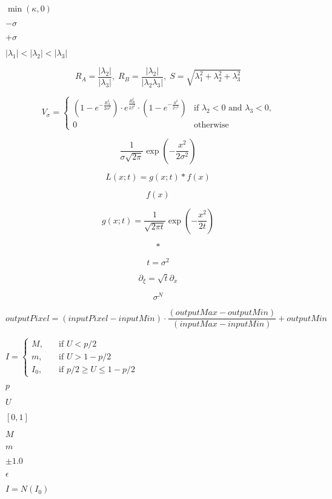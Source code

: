 \documentclass{article}
\begin{document}
$ \min(\kappa,0) $
\pagebreak

$-\sigma$
\pagebreak

$+\sigma$
\pagebreak

$ | \lambda_1 | < | \lambda_2 | < |\lambda_3 | $
\pagebreak

\[ R_A = \frac{|\lambda_2|}{|\lambda_3|}, \; R_B = \frac{|\lambda_2|}{|\lambda_2\lambda_3|}, \; S = \sqrt{\lambda_1^2+\lambda_2^2+\lambda_3^2} \]
\pagebreak

\[ V_{\sigma}= \begin{cases} (1-e^{-\frac{R_A^2}{2\alpha^2}}) \cdot e^{\frac{R_B^2}{2\beta^2}} \cdot (1-e^{-\frac{S^2}{2\gamma^2}}) & \text{if } \lambda_2<0 \text{ and } \lambda_3<0 \text{,}\\ 0 & \text{otherwise} \end{cases} \]
\pagebreak

\[ \frac{ 1 }{ \sigma \sqrt{ 2 \pi } } \exp{ \left( - \frac{x^2}{ 2 \sigma^2 } \right) } \]
\pagebreak

\[ L(x; t) = g(x; t) \ast f(x) \]
\pagebreak

\[ f(x) \]
\pagebreak

\[ g(x; t) = \frac{1}{ \sqrt{ 2 \pi t} } \exp{ \left( -\frac{x^2}{ 2 t } \right) } \]
\pagebreak

\[\ast\]
\pagebreak

\[ t = \sigma^2 \]
\pagebreak

\[ \partial_\xi = \sqrt{t} \partial_x \]
\pagebreak

\[ \sigma^N \]
\pagebreak

\[ outputPixel = ( inputPixel - inputMin) \cdot \frac{(outputMax - outputMin )}{(inputMax - inputMin)} + outputMin \]
\pagebreak

$ I = \begin{cases} M, & \quad \text{if } U < p/2 \\ m, & \quad \text{if } U > 1 - p/2 \\ I_0, & \quad \text{if } p/2 \geq U \leq 1 - p/2 \end{cases} $
\pagebreak

$ p $
\pagebreak

$ U $
\pagebreak

$ [0,1] $
\pagebreak

$ M $
\pagebreak

$ m $
\pagebreak

$\pm 1.0$
\pagebreak

$ \epsilon $
\pagebreak

$ I = N(I_0) $
\pagebreak
\end{document}
